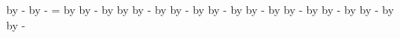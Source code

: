 {{        
        \pgfextract@process\uppereastsouthjoin{\pgfpoint{\the\pgf@xa}{\the\pgf@ya}}
        \addtosavedmacro{\uppereastsouthjoin}
        \advance\pgf@ya by -\scarceoffset
        \advance\pgf@xa by -\scarceoffset
        \pgfextract@process\uppersoutheastjoin{\pgfpoint{\the\pgf@xa}{\the\pgf@ya}}
        \addtosavedmacro{\uppersoutheastjoin}
        \pgf@xa=\pgf@xc
        \advance\pgf@xa by \scarceoffset
        \pgfextract@process\uppersouthwestjoin{\pgfpoint{\the\pgf@xa}{\the\pgf@ya}}
        \addtosavedmacro{\uppersouthwestjoin}
        \advance\pgf@xa by -\scarceoffset
        \advance\pgf@ya by \scarceoffset
        \pgfextract@process\upperwestsouthjoin{\pgfpoint{\the\pgf@xa}{\the\pgf@ya}}
        \addtosavedmacro{\upperwestsouthjoin}
        \upperwestnorthjoin
        \advance\pgf@x by \offset
        \advance\pgf@y by -\offset
        \pgfextract@process\lowerwestnorthjoin{\pgfpoint{\the\pgf@x}{\the\pgf@y}}
        \addtosavedmacro{\lowerwestnorthjoin}
        \uppernorthwestjoin
        \advance\pgf@x by \offset
        \advance\pgf@y by -\offset
        \pgfextract@process\lowernorthwestjoin{\pgfpoint{\the\pgf@x}{\the\pgf@y}}
        \addtosavedmacro{\lowernorthwestjoin}
        \uppernortheastjoin
        \advance\pgf@x by \offset
        \advance\pgf@y by -\offset
        \pgfextract@process\lowernortheastjoin{\pgfpoint{\the\pgf@x}{\the\pgf@y}}
        \addtosavedmacro{\lowernortheastjoin}
        \uppereastnorthjoin
        \advance\pgf@x by \offset
        \advance\pgf@y by -\offset
        \pgfextract@process\lowereastnorthjoin{\pgfpoint{\the\pgf@x}{\the\pgf@y}}
        \addtosavedmacro{\lowereastnorthjoin}
        \uppereastsouthjoin
        \advance\pgf@x by \offset
        \advance\pgf@y by -\offset
        \pgfextract@process\lowereastsouthjoin{\pgfpoint{\the\pgf@x}{\the\pgf@y}}
        \addtosavedmacro{\lowereastsouthjoin}
        \uppersoutheastjoin
        \advance\pgf@x by \offset
        \advance\pgf@y by -\offset
        \pgfextract@process\lowersoutheastjoin{\pgfpoint{\the\pgf@x}{\the\pgf@y}}
        \addtosavedmacro{\lowersoutheastjoin}
        \uppersouthwestjoin
        \advance\pgf@x by \offset
        \advance\pgf@y by -\offset
        \pgfextract@process\lowersouthwestjoin{\pgfpoint{\the\pgf@x}{\the\pgf@y}}
        \addtosavedmacro{\lowersouthwestjoin}
        \upperwestsouthjoin
        \advance\pgf@x by \offset
        \advance\pgf@y by -\offset
        \pgfextract@process\lowerwestsouthjoin{\pgfpoint{\the\pgf@x}{\the\pgf@y}}
        \addtosavedmacro{\lowerwestsouthjoin}
}}
